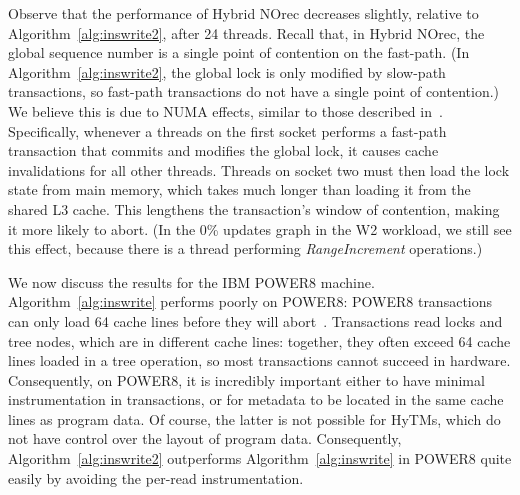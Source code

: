 Observe that the performance of Hybrid NOrec decreases slightly, relative to Algorithm~\ref{alg:inswrite2}, after 24 threads.
Recall that, in Hybrid NOrec, the global sequence number is a single point of contention on the fast-path.
(In Algorithm~\ref{alg:inswrite2}, the global lock is only modified by slow-path transactions, so fast-path transactions do not have a single point of contention.)
We believe this is due to NUMA effects, similar to those described in~\cite{BKLL16}.
Specifically, whenever a threads on the first socket performs a fast-path transaction that commits and modifies the global lock, it causes cache invalidations for all other threads.
Threads on socket two must then load the lock state from main memory, which takes much longer than loading it from the shared L3 cache.
This lengthens the transaction's window of contention, making it more likely to abort.
(In the 0\% updates graph in the W2 workload, we still see this effect, because there is a thread performing \textit{RangeIncrement} operations.)

We now discuss the results for the IBM POWER8 machine.
Algorithm~\ref{alg:inswrite} performs poorly on POWER8: POWER8 transactions can only load 64 cache lines before they will abort~\cite{nguyen-thesis}. 
Transactions read locks and tree nodes, which are in different cache lines: together, they often exceed 64 cache lines loaded in a tree operation, 
so most transactions cannot succeed in hardware. Consequently, on POWER8, 
it is incredibly important either to have minimal instrumentation in transactions, or for metadata to be located in the 
same cache lines as program data. Of course, the latter is not possible for HyTMs, which do not have control over the layout of program data.
Consequently, Algorithm~\ref{alg:inswrite2} outperforms Algorithm~\ref{alg:inswrite} in POWER8 quite easily by avoiding the per-read instrumentation. 

